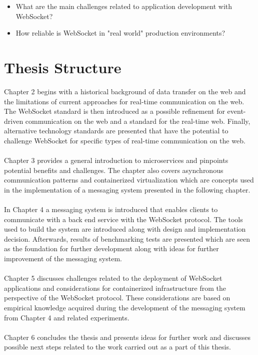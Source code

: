 \begin{itemize}
\item What are the main challenges related to application development with WebSocket?
\item How reliable is WebSocket in "real world" production environments?
\end{itemize}

\section{Thesis Structure}

Chapter 2 begins with a historical background of data transfer on the web and the limitations of current approaches for real-time communication on the web. The WebSocket standard is then introduced as a possible refinement for event-driven communication on the web and a standard for the real-time web. Finally, alternative technology standards are presented that have the potential to challenge WebSocket for specific types of real-time communication on the web.
\\ \\
Chapter 3 provides a general introduction to microservices and pinpoints potential benefits and challenges. The chapter also covers asynchronous communication patterns and containerized virtualization which are concepts used in the implementation of a messaging system presented in the following chapter.
\\ \\
In Chapter 4 a messaging system is introduced that enables clients to communicate with a back end service with the WebSocket protocol. The tools used to build the system are introduced along with design and implementation decision. Afterwards, results of benchmarking tests are presented which are seen as the foundation for further development along with ideas for further improvement of the messaging system.
\\ \\
Chapter 5 discusses challenges related to the deployment of WebSocket applications and considerations for containerized infrastructure from the perspective of the WebSocket protocol. These considerations are based on empirical knowledge acquired during the development of the messaging system from Chapter 4 and related experiments.
\\ \\
Chapter 6 concludes the thesis and presents ideas for further work and discusses possible next steps related to the work carried out as a part of this thesis.
